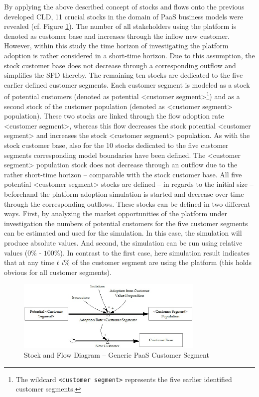By applying the above described concept of stocks and flows onto the previous developed \ac{CLD}, 11 crucial stocks in the domain of \ac{PaaS} business models were revealed (cf. Figure \ref{fig:sfd_cs}). The number of all stakeholders using the platform is denoted as customer base and increases through the inflow new customer. However, within this study the time horizon of investigating the platform adoption is rather considered in a short-time horizon. Due to this assumption, the stock customer base does not decrease through a corresponding outflow and simplifies the \ac{SFD} thereby. The remaining ten stocks are dedicated to the five earlier defined customer segments. Each customer segment is modeled as a stock of potential customers (denoted as potential <customer segment>\footnote{The wildcard \texttt{<customer segment>} represents the five earlier identified customer segments.}) and as a second stock of the customer population (denoted as <customer segment> population). These two stocks are linked through the flow adoption rate <customer segment>, whereas this flow decreases the stock potential <customer segment> and increases the stock <customer segment> population. As with the stock customer base, also for the 10 stocks dedicated to the five customer segments corresponding model boundaries have been defined. The <customer segment> population stock does not decrease through an outflow due to the rather short-time horizon -- comparable with the stock customer base. All five potential <customer segment> stocks are defined -- in regards to the initial size -- beforehand the platform adoption simulation is started and decrease over time through the corresponding outflows. These stocks can be defined in two different ways. First, by analyzing the market opportunities of the platform under investigation the numbers of potential customers for the five customer segments can be estimated and used for the simulation. In this case, the simulation will produce absolute values. And second, the simulation can be run using relative values ($0\%$ - $100\%$). In contrast to the first case, here simulation result indicates that at any time $t$ $i\%$ of the customer segment are using the platform (this holds obvious for all customer segments).

\begin{figure}[tb]
	\centering
	\includegraphics[width=0.8\textwidth]{gfx/sfd_customerSegment}
	\caption{Stock and Flow Diagram -- Generic PaaS Customer Segment}
	\label{fig:sfd_cs}
\end{figure}

